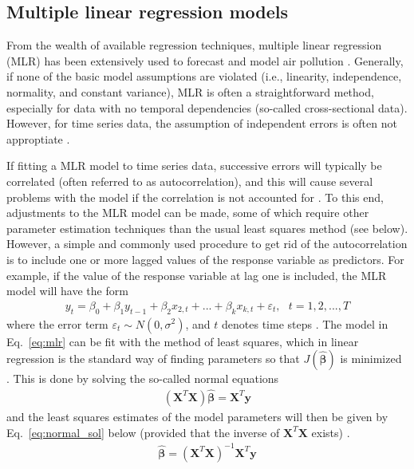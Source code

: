 \subsection{Multiple linear regression models}
From the wealth of available regression techniques, multiple linear regression (MLR) has been extensively used to forecast and model air pollution \cite{atmos7020015}. Generally, if none of the basic model assumptions are violated (i.e., linearity, independence, normality, and constant variance), MLR is often a straightforward method, especially for data with no temporal dependencies (so-called cross-sectional data). However, for time series data, the assumption of independent errors is often not approptiate \cite{Montgomery2015}. 

If fitting a MLR model to time series data, successive errors will typically be correlated (often referred to as autocorrelation), and this will cause several problems with the model if the correlation is not accounted for \cite{Montgomery2015}. To this end, adjustments to the MLR model can be made, some of which require other parameter estimation techniques than the usual least squares method (see below). However, a simple and commonly used procedure to get rid of the autocorrelation is to include one or more lagged values of the response variable as predictors. For example, if the value of the response variable at lag one is included, the MLR model will have the form 
\begin{align}
y_t = \beta_0 + \beta_{1} y_{t-1} + \beta_2 x_{2,t} + ... + \beta_{k} x_{k,t} + \varepsilon_t, \: \: \: t = 1, 2, ..., T
\label{eq:mlr}
\end{align}
where the error term $\varepsilon_t \sim  N(0, \sigma^2)$, and $t$ denotes time steps \cite{Montgomery2015}. The model in Eq.\ \ref{eq:mlr} can be fit with the method of least squares, which in linear regression is the standard way of finding parameters so that $J(\bm{\hat{\beta}})$ is minimized \cite{smlbook}. This is done by solving the so-called normal equations
\begin{align}
(\bm{X}^T\bm{X})\bm{\hat{\beta}} = \bm{X}^T\bm{y}
\label{eq:normal_eq}
\end{align}
and the least squares estimates of the model parameters will then be given by Eq.\ \ref{eq:normal_sol} below (provided that the inverse of $\bm{X}^T\bm{X}$ exists) \cite{smlbook}.
\begin{align}
\bm{\hat{\beta}} = (\bm{X}^T\bm{X})^{-1}\bm{X}^T\bm{y}
\label{eq:normal_sol} 
\end{align}

